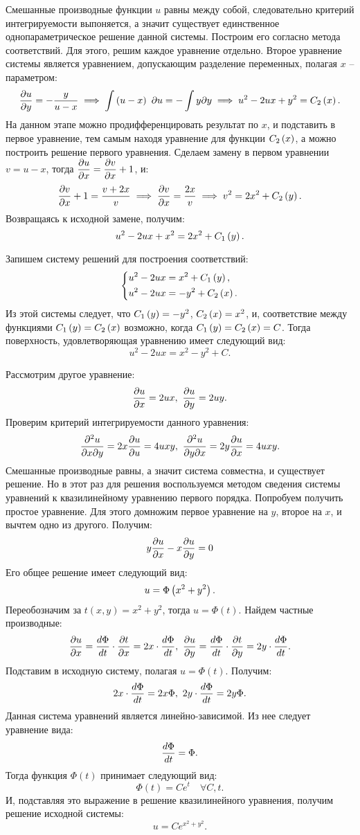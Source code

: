 		Смешанные производные функции $u$ равны между собой, следовательно критерий интегрируемости выпоняется, а значит существует единственное однопараметрическое решение данной системы. Построим его согласно метода соответствий. Для этого, решим каждое уравнение отдельно. Второе уравнение системы является уравнением, допускающим разделение переменных, полагая $x$ -- параметром:
		\[ \dfrac{\partial u}{\partial y} = - \frac{y}{u - x} \implies \int \left( u - x \right) ~ \partial u = - \int y \partial y \implies u^2 - 2ux + y^2 = C_2 \left( x \right). \]
		На данном этапе можно продифференцировать результат по $x$, и подставить в первое уравнение, тем самым находя уравнение для функции $C_2 \left( x \right)$, а можно построить решение первого уравнения. Сделаем замену в первом уравнении $v = u - x$, тогда $\dfrac{\partial u}{\partial x} = \dfrac{\partial v}{\partial x} + 1$, и:
		\[ \dfrac{\partial v}{\partial x} + 1 = \frac{v + 2x}{v} \implies \dfrac{\partial v}{\partial x} = \frac{2x}{v} \implies v^2 = 2x^2 + C_2 \left( y \right). \]
		Возвращаясь к исходной замене, получим:
		\[ u^2 - 2ux + x^2 = 2x^2 + C_1\left( y \right). \]

		Запишем систему решений для построения соответствий:
		\[ \left\lbrace \begin{split}
			u^2 - 2ux &= x^2 + C_1 \left( y \right), \\
			u^2 - 2ux &= -y^2 + C_2 \left( x \right).
		\end{split} \right. \]
		Из этой системы следует, что $C_1 \left( y \right) = -y^2$, $C_2 \left( x \right) = x^2$, и, соответствие между функциями $C_1 \left( y \right) = C_2 \left( x \right)$ возможно, когда $C_1 \left( y \right) = C_2 \left( x \right) = C$. Тогда поверхность, удовлетворяющая уравнению имеет следующий вид:
		\[ u^2 - 2ux = x^2 - y^2 + C. \] 

		\vspace{10pt}

		Рассмотрим другое уравнение:
		\[ \dfrac{\partial u}{\partial x} = 2ux, ~ \dfrac{\partial u}{\partial y} = 2uy. \]
		Проверим критерий интегрируемости данного уравнения:
		\[ \dfrac{\partial^2 u}{\partial x \partial y} = 2x \dfrac{\partial u}{\partial u} = 4uxy, ~ \dfrac{\partial^2 u}{\partial y \partial x} = 2y \dfrac{\partial u}{\partial x} = 4uxy. \]
		Смешанные производные равны, а значит система совместна, и существует решение. Но в этот раз для решения воспользуемся методом сведения системы уравнений к квазилинейному уравнению первого порядка. Попробуем получить простое уравнение. Для этого домножим первое уравнение на $y$, второе на $x$, и вычтем одно из другого. Получим:
		\[ y \dfrac{\partial u}{\partial x} - x \dfrac{\partial u}{\partial y} = 0 \]
		Его общее решение имеет следующий вид:
		\[ u = \Phi\left( x^2 + y^2 \right). \]
		Переобозначим за $t(x, y) = x^2 + y^2$, тогда $u = \Phi(t)$. Найдем частные производные:
		\[ \dfrac{\partial u}{\partial x} = \dfrac{d \Phi}{d t} \cdot \dfrac{\partial t}{\partial x} = 2x \cdot \dfrac{d \Phi}{d t}, ~ \dfrac{\partial u}{\partial y} = \dfrac{d \Phi}{d t} \cdot \dfrac{\partial t}{\partial y} = 2y \cdot \dfrac{d \Phi}{d t}. \]
		Подставим в исходную систему, полагая $u = \Phi(t)$. Получим:
		\[ 2x \cdot \dfrac{d \Phi}{d t} = 2x \Phi, ~ 2y \cdot \dfrac{d \Phi}{d t} = 2y \Phi. \]
		Данная система уравнений является линейно-зависимой. Из нее следует уравнение вида:
		\[ \dfrac{d \Phi}{d t} = \Phi. \]
		Тогда функция $\Phi(t)$ принимает следующий вид:
		\[ \Phi(t) = C e^{t} \quad \forall C, t. \]
		И, подставляя это выражение в решение квазилинейного уравнения, получим решение исходной системы:
		\[ u = C e^{x^2 + y^2}. \]

